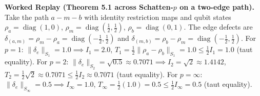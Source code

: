 \documentclass[
]{article}
\begin{document}
\textbf{Worked Replay (Theorem 5.1 across Schatten-\(p\) on a two-edge path).} Take the path \(a - m - b\) with identity restriction maps and qubit states \(\rho_a = \operatorname{diag}(1,0)\), \(\rho_m = \operatorname{diag}(\tfrac12,\tfrac12)\), \(\rho_b = \operatorname{diag}(0,1)\). The edge defects are \(\delta_{(a,m)} = \rho_m - \rho_a = \operatorname{diag}(-\tfrac12, \tfrac12)\) and \(\delta_{(m,b)} = \rho_b - \rho_m = \operatorname{diag}(-\tfrac12, \tfrac12)\).
For \(p = 1\): \(\|\delta_e\|_{S_1} = 1.0 \implies I_1 = 2.0\), \(T_1 = \frac{1}{2}\|\rho_a - \rho_b\|_{S_1} = 1.0 \le \frac{1}{2} I_1 = 1.0\) (taut equality).
For \(p = 2\): \(\|\delta_e\|_{S_2} = \sqrt{0.5} \approx 0.7071 \implies I_2 = \sqrt{2} \approx 1.4142\), \(T_2 = \frac{1}{2} \sqrt{2} \approx 0.7071 \le \frac{1}{2} I_2 \approx 0.7071\) (taut equality).
For \(p = \infty\): \(\|\delta_e\|_{S_\infty} = 0.5 \implies I_\infty = 1.0\), \(T_\infty = \frac{1}{2}(1.0) = 0.5 \le \frac{1}{2} I_\infty = 0.5\) (taut equality).
\end{document}
